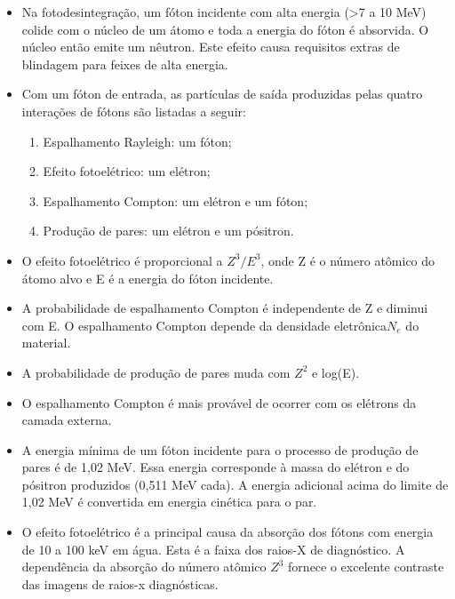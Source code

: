 \documentclass[11pt,a4paper]{article}
\newcounter{exemplo}
\begin{document}
\begin{exemplo}
\begin{itemize}
        \item Na fotodesintegração, um fóton incidente com alta energia (>7 a 10 MeV) colide com o núcleo de um átomo e toda a energia do fóton é absorvida. O núcleo então emite um nêutron. Este efeito causa requisitos extras de blindagem para feixes de alta energia.
        
        \item Com um fóton de entrada, as partículas de saída produzidas pelas quatro interações de fótons são listadas a seguir:
            \begin{enumerate}[label=\roman*.]
                \item Espalhamento Rayleigh: um fóton;
                \item Efeito fotoelétrico: um elétron;
                \item Espalhamento Compton: um elétron e um fóton;
                \item Produção de pares: um elétron e um pósitron.
            \end{enumerate}

        \item O efeito fotoelétrico é proporcional a $Z^3/E^3$, onde Z é o número atômico do átomo alvo e E é a energia do fóton incidente.
        
        \item A probabilidade de espalhamento Compton é independente de Z e diminui com E. O espalhamento Compton depende da densidade eletrônica$N_e$ do material.
        
        \item A probabilidade de produção de pares muda com $Z^2$ e log(E).
        
        \item O espalhamento Compton é mais provável de ocorrer com os elétrons da camada externa.
        
        \item A energia mínima de um fóton incidente para o processo de produção de pares é de 1,02 MeV. Essa energia corresponde à massa do elétron e do pósitron produzidos (0,511 MeV cada). A energia adicional acima do limite de 1,02 MeV é convertida em energia cinética para o par.
        
        \item O efeito fotoelétrico é a principal causa da absorção dos fótons com energia de 10 a 100 keV em água. Esta é a faixa dos raios-X de diagnóstico. A dependência da absorção do número atômico $Z^3$ fornece o excelente contraste das imagens de raios-x diagnósticas.
        

\end{itemize}
\end{exemplo}
\end{document}
